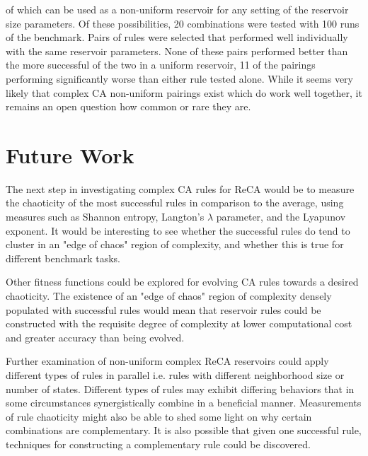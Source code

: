 \documentclass{article}
\begin{document}
\begin{multicols}{2}
        of which can be used as a non-uniform reservoir for  any setting of the 
        reservoir size parameters. Of these possibilities, 20 combinations were 
        tested with 100 runs of the benchmark. Pairs of rules were selected 
        that performed well individually with the same reservoir parameters.  
        None of these pairs performed better than the more successful of the 
        two in a uniform reservoir, 11 of the pairings performing significantly 
        worse than either rule tested alone. While it seems very likely that 
        complex CA non-uniform pairings exist which do work well together, it 
        remains an open question how common or rare they are.
 



\section{Future Work}\label{future_work}
The next step in investigating complex CA rules for ReCA would be to measure 
the chaoticity of the most successful rules in comparison to the average, using 
measures such as Shannon entropy, Langton's $\lambda$ parameter, and the 
Lyapunov exponent. It would be interesting to see whether the successful rules 
do tend to cluster in an "edge of chaos" region of complexity, and whether this
is true for different benchmark tasks. \par Other fitness functions could be 
explored for evolving CA rules towards a desired chaoticity. The existence of 
an "edge of chaos" region of complexity densely populated with successful rules 
would mean that reservoir rules could be constructed with the requisite degree 
of complexity at lower computational cost and greater accuracy than being 
evolved.  \par Further examination of non-uniform complex ReCA reservoirs could 
apply different types of rules in parallel i.e.  rules with different 
neighborhood size or number of states.  Different types of rules may exhibit 
differing behaviors that in some circumstances synergistically combine in a 
beneficial manner.  Measurements of rule chaoticity might also be able to shed 
some light on why certain combinations are complementary. It is also possible 
that given one successful rule, techniques for constructing a complementary 
rule could be discovered.



\end{multicols}
\end{document}
